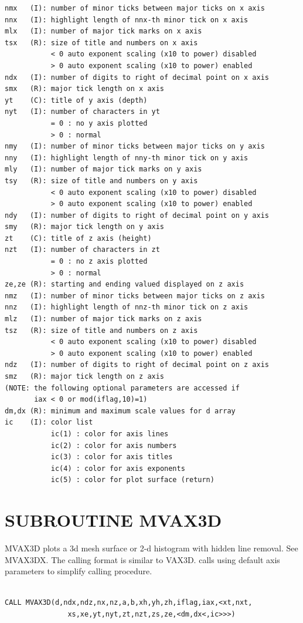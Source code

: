 \documentclass[11pt]{report}
\begin{document}
\begin{verbatim}
nmx   (I): number of minor ticks between major ticks on x axis
nnx   (I): highlight length of nnx-th minor tick on x axis
mlx   (I): number of major tick marks on x axis
tsx   (R): size of title and numbers on x axis
           < 0 auto exponent scaling (x10 to power) disabled
           > 0 auto exponent scaling (x10 to power) enabled
ndx   (I): number of digits to right of decimal point on x axis
smx   (R): major tick length on x axis
yt    (C): title of y axis (depth)
nyt   (I): number of characters in yt
           = 0 : no y axis plotted
           > 0 : normal
nmy   (I): number of minor ticks between major ticks on y axis
nny   (I): highlight length of nny-th minor tick on y axis
mly   (I): number of major tick marks on y axis
tsy   (R): size of title and numbers on y axis
           < 0 auto exponent scaling (x10 to power) disabled
           > 0 auto exponent scaling (x10 to power) enabled
ndy   (I): number of digits to right of decimal point on y axis
smy   (R): major tick length on y axis
zt    (C): title of z axis (height)
nzt   (I): number of characters in zt
           = 0 : no z axis plotted
           > 0 : normal
ze,ze (R): starting and ending valued displayed on z axis
nmz   (I): number of minor ticks between major ticks on z axis
nnz   (I): highlight length of nnz-th minor tick on z axis
mlz   (I): number of major tick marks on z axis
tsz   (R): size of title and numbers on z axis
           < 0 auto exponent scaling (x10 to power) disabled
           > 0 auto exponent scaling (x10 to power) enabled
ndz   (I): number of digits to right of decimal point on z axis
smz   (R): major tick length on z axis
(NOTE: the following optional parameters are accessed if 
       iax < 0 or mod(iflag,10)=1)
dm,dx (R): minimum and maximum scale values for d array
ic    (I): color list
           ic(1) : color for axis lines
           ic(2) : color for axis numbers
           ic(3) : color for axis titles
           ic(4) : color for axis exponents
           ic(5) : color for plot surface (return)
\end{verbatim}

\newpage
\section{SUBROUTINE MVAX3D}

MVAX3D plots a 3d mesh surface or 2-d histogram with hidden line removal.
See MVAX3DX.  The calling format is similar to VAX3D.
 calls  using default axis parameters to simplify calling
procedure.
\begin{verbatim}

CALL MVAX3D(d,ndx,ndz,nx,nz,a,b,xh,yh,zh,iflag,iax,<xt,nxt,
               xs,xe,yt,nyt,zt,nzt,zs,ze,<dm,dx<,ic>>>)
\end{verbatim}
\end{document}
